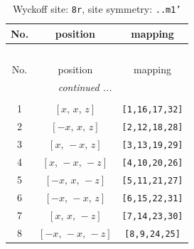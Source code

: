 \documentclass[fleqn,8pt]{jsarticle}
\begin{document}
\begin{longtable}{ccc}
\caption{Wyckoff site: {\tt 8r}, site symmetry: {\tt ..m1'}}
 \\
 \hline \hline
No. & position & mapping \\ \hline \endfirsthead

\multicolumn{2}{l}{\tablename\ \thetable{}} \\
 \hline \hline
No. & position & mapping \\ \hline \endhead

 \hline \hline
\multicolumn{2}{r}{\footnotesize\it continued ...} \\ \endfoot

 \hline \hline
\multicolumn{2}{r}{} \\ \endlastfoot

1 & $\left[ x,\, x,\, z \right]$ & {\tt [1,16,17,32]} \\ \hline
2 & $\left[ - x,\, x,\, z \right]$ & {\tt [2,12,18,28]} \\ \hline
3 & $\left[ x,\, - x,\, z \right]$ & {\tt [3,13,19,29]} \\ \hline
4 & $\left[ x,\, - x,\, - z \right]$ & {\tt [4,10,20,26]} \\ \hline
5 & $\left[ - x,\, x,\, - z \right]$ & {\tt [5,11,21,27]} \\ \hline
6 & $\left[ - x,\, - x,\, z \right]$ & {\tt [6,15,22,31]} \\ \hline
7 & $\left[ x,\, x,\, - z \right]$ & {\tt [7,14,23,30]} \\ \hline
8 & $\left[ - x,\, - x,\, - z \right]$ & {\tt [8,9,24,25]} \\
\end{longtable}
\renewcommand{\arraystretch}{1.2}
\end{document}
